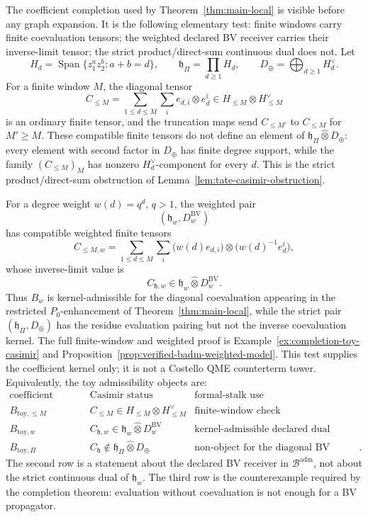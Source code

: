 \documentclass[11pt]{memoir}
\begin{document}
The coefficient completion used by Theorem~\ref{thm:main-local} is
visible before any graph expansion.  It is the following elementary
test: finite windows carry finite coevaluation tensors; the weighted
declared BV receiver carries their inverse-limit tensor; the strict
product/direct-sum continuous dual does not.  Let
\[
  H_d=\operatorname{Span}\{z_1^az_2^b:a+b=d\},\qquad
  \mathfrak h_\Pi=\prod_{d\ge1}H_d,\qquad
  D_\oplus=\bigoplus_{d\ge1}H_d^\vee .
\]
For a finite window \(M\), the diagonal tensor
\[
  C_{\le M}=\sum_{1\le d\le M}\sum_i e_{d,i}\otimes e^i_d
  \in H_{\le M}\otimes H_{\le M}^\vee
\]
is an ordinary finite tensor, and the truncation maps send
\(C_{\le M'}\) to \(C_{\le M}\) for \(M'\ge M\).  These compatible
finite tensors do not define an element of
\(\mathfrak h_\Pi\widehat\otimes D_\oplus\): every element with
second factor in \(D_\oplus\) has finite degree support, while the
family \((C_{\le M})_M\) has nonzero \(H_d^\vee\)-component for every
\(d\).  This is the strict product/direct-sum obstruction of
Lemma~\ref{lem:tate-casimir-obstruction}.

For a degree weight \(w(d)=q^d\), \(q>1\), the weighted pair
\[
  (\mathfrak h_w,D^{\mathrm{BV}}_w)
\]
has compatible weighted finite tensors
\[
  C_{\le M,w}
  =
  \sum_{1\le d\le M}\sum_i
  \bigl(w(d)e_{d,i}\bigr)\otimes
  \bigl(w(d)^{-1}e^i_d\bigr),
\]
whose inverse-limit value is
\[
  C_{\mathfrak h,w}
  \in
  \mathfrak h_w\widehat\otimes
  D^{\mathrm{BV}}_w .
\]
Thus \(B_w\) is kernel-admissible for the diagonal coevaluation
appearing in the restricted \(P_0\)-enhancement of
Theorem~\ref{thm:main-local}, while the strict pair
\((\mathfrak h_\Pi,D_\oplus)\) has the residue evaluation pairing but
not the inverse coevaluation kernel.  The full finite-window and
weighted proof is Example~\ref{ex:completion-toy-casimir} and
Proposition~\ref{prop:verified-badm-weighted-model}.  This test supplies
the coefficient kernel only; it is not a Costello QME counterterm tower.
Equivalently, the toy admissibility objects are:
\[
\begin{array}{c|c|c}
  \text{coefficient object} & \text{Casimir status}
    & \text{formal-stalk use}\\ \hline
  B_{\mathrm{toy},\le M}
    & C_{\le M}\in H_{\le M}\otimes H_{\le M}^{\vee}
    & \text{finite-window check}\\
  B_{\mathrm{toy},w}
    & C_{\mathfrak h,w}\in
      \mathfrak h_w\widehat\otimes
      D^{\mathrm{BV}}_w
    & \text{kernel-admissible declared dual}\\
  B_{\mathrm{toy},\Pi}
    & C_{\mathfrak h}\notin
      \mathfrak h_\Pi\widehat\otimes D_\oplus
    & \text{non-object for the diagonal BV kernel}.
\end{array}
\]
The second row is a statement about the declared BV receiver in
\(\mathcal B^{\mathrm{adm}}\), not about the strict continuous dual of
\(\mathfrak h_w\).  The third row is the counterexample required by the
completion theorem: evaluation without coevaluation is not enough for a
BV propagator.
\end{document}
